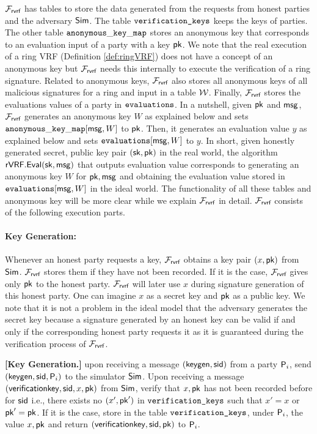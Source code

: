 $ \mathcal{F}_{\textsf{rvrf}} $ has tables to store the data generated from the requests from honest parties and the adversary $ \mathsf{Sim} $. The table $ \texttt{verification\_keys} $  keeps the keys of parties. The other table  $ \mathtt{anonymous\_key\_map} $ stores an anonymous key that corresponds to an evaluation input  of a party with a key $ \mathsf{pk} $. We note that the real execution of a ring VRF (Definition \ref{def:ringVRF}) does not have a concept of an anonymous key but $ \mathcal{F}_{\textsf{rvrf}} $ needs this internally to execute the verification of a ring signature. Related to anonymous keys, $ \mathcal{F}_{\textsf{rvrf}} $ also stores  all  anonymous keys of all malicious  signatures  for a ring and input in a table $ \mathcal{W} $. Finally, $ \mathcal{F}_{\textsf{rvrf}} $ stores the evaluations values of a party in $ \texttt{evaluations} $. In a nutshell,  given $ \mathsf{pk} $
and $ \mathsf{msg} $, $ \mathcal{F}_{\textsf{rvrf}} $  generates an anonymous key $ W $ as explained below and  sets $ \mathtt{anonymous\_key\_map}[\mathsf{msg},W]  $ to $ \mathsf{pk} $. Then, it generates an evaluation value $ y $ as explained below and sets $ \texttt{evaluations}[\mathsf{msg},W]  $ to $ y $. In short, given honestly generated secret, public key pair $ (\mathsf{sk},\mathsf{pk}) $ in the real world, the algorithm
$ {\mathsf{rVRF}}.{\mathsf{Eval}}(\mathsf{sk},\mathsf{msg}) $  that outputs evaluation value corresponds to generating an anonymous key $ W $ for $ \mathsf{pk}, \mathsf{msg} $ and obtaining the evaluation value stored in $ \texttt{evaluations}[\mathsf{msg},W] $ in the ideal world. The functionality of all these tables and anonymous key will be more clear while we explain $ \mathcal{F}_{\textsf{rvrf}} $ in detail. $ \mathcal{F}_{\textsf{rvrf}} $ consists of the following execution parts.



\paragraph{Key Generation:}  Whenever an honest party requests  a key, $ \mathcal{F}_{\textsf{rvrf}} $ obtains a key pair $ (x, \mathsf{pk}) $ from $ \mathsf{Sim} $. $ \mathcal{F}_{\textsf{rvrf}} $ stores them if they have not been recorded. If it is the case, $ \mathcal{F}_{\textsf{rvrf}} $ gives only $ \mathsf{pk} $ to the honest party. $ \mathcal{F}_{\textsf{rvrf}} $ will later use $ x $ during signature generation of this honest party. One can imagine $ x $ as a secret key and $ \mathsf{pk} $ as a public key. We note that it is not a problem in the ideal model that the adversary generates the secret key because a signature generated by an honest key can be valid if and only if the corresponding honest party requests it as it is guaranteed during the verification process of $ \mathcal{F}_{\textsf{rvrf}} $.

\begin{tcolorbox}[left=2pt,right=2pt]
	\textbf{[Key Generation.]} upon receiving a message $(\mathsf{keygen}, \textsf{sid})$ from a party $\mathsf{P}_i$, send $(\mathsf{keygen}, \textsf{sid}, \mathsf{P}_i)$ to the simulator $\mathsf{Sim}$.
	Upon receiving a message $(\mathsf{verificationkey}, \textsf{sid}, x,\mathsf{pk})$ from $\mathsf{Sim}$, verify that $x,\mathsf{pk}$ has not been recorded before for $ \textsf{sid} $ i.e., there exists no $ (x', \mathsf{pk}') $ in $ \texttt{verification\_keys} $ such that $ x' = x $ or $ \mathsf{pk}' = \mathsf{pk} $. If it is the case, store in the table $\texttt{verification\_keys}$, under $\mathsf{P}_i$, the value $x,\mathsf{pk}$ and return $(\mathsf{verificationkey}, \textsf{sid}, \mathsf{pk})$ to $ \mathsf{P}_i$.
\end{tcolorbox}

